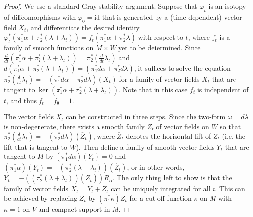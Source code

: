 \documentclass{amsart}
\theoremstyle{remark}
\def\id{{\textrm{id}}}
\begin{document}
\begin{proof}
We use a standard Gray stability argument.
Suppose that $\varphi_t$ is an isotopy of diffeomorphisms with $\varphi_0 = \id$ that is generated by a (time-dependent) vector field $X_t$, and 
differentiate the desired identity $\varphi_t^* (\pi_1^* \alpha + \pi_2^* (\lambda + \lambda_t)) = f_t (\pi_1^* \alpha + \pi_2^* \lambda)$ with respect to $t$, where $f_t$ is a family of smooth functions on $M \times W$ yet to be determined.
Since $\frac{d}{dt} (\pi_1^* \alpha + \pi_2^* (\lambda + \lambda_t)) = \pi_2^* (\frac{d}{dt} \lambda_t)$ and $d(\pi_1^* \alpha + \pi_2^* (\lambda + \lambda_t)) = (\pi_1^* d\alpha + \pi_2^* d\lambda)$, it suffices to solve the equation $\pi_2^* (\frac{d}{dt} \lambda_t) = - (\pi_1^* d\alpha + \pi_2^* d\lambda) (X_t)$ for a family of vector fields $X_t$ that are tangent to $\ker (\pi_1^* \alpha + \pi_2^* (\lambda + \lambda_t))$.
Note that in this case $f_t$ is independent of $t$, and thus $f_t = f_0 = 1$.

The vector fields $X_t$ can be constructed in three steps.
Since the two-form $\omega = d\lambda$ is non-degenerate, there exists a smooth family $Z_t$ of vector fields on $W$ so that $\pi_2^* (\frac{d}{dt} \lambda_t) = - (\pi_2^* d\lambda) (\overline{Z}_t)$, where $\overline{Z}_t$ denotes the horizontal lift of $Z_t$ (i.e. the lift that is tangent to $W$).
Then define a family of smooth vector fields $Y_t$ that are tangent to $M$ by $(\pi_1^* d\alpha) (Y_t) = 0$ and $(\pi_1^* \alpha) (Y_t) = - (\pi_2^* (\lambda + \lambda_t)) (\overline{Z}_t)$, or in other words, $Y_t = - ((\pi_2^* (\lambda + \lambda_t)) (\overline{Z}_t)) \overline{R}_\alpha$.
The only thing left to show is that the family of vector fields $X_t = Y_t + \overline{Z}_t$ can be uniquely integrated for all $t$.
This can be achieved by replacing $\overline{Z}_t$ by $(\pi_1^* \kappa) \overline{Z}_t$ for a cut-off function $\kappa$ on $M$ with $\kappa = 1$ on $V$ and compact support in $M$.
\end{proof}
\end{document}
